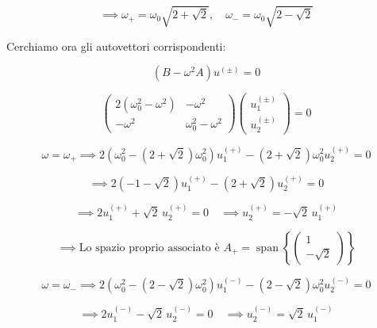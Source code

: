\begin{equation}
\implies \omega_+ = \omega_0 \sqrt{2 + \sqrt{2}}, \quad 
\omega_- = \omega_0 \sqrt{2 - \sqrt{2}}
\end{equation}

Cerchiamo ora gli autovettori corrispondenti:

\begin{equation*}
(B - \omega^2 A)u^{(\pm)} = 0
\end{equation*}

\begin{equation*}
\begin{pmatrix}
2(\omega_0^2 - \omega^2) & -\omega^2 \\
-\omega^2 & \omega_0^2 - \omega^2
\end{pmatrix}
\begin{pmatrix}
u^{(\pm)}_1 \\ u^{(\pm)}_2
\end{pmatrix}
= 0
\end{equation*}


\begin{equation*}
\omega = \omega_+ \implies 2(\omega_0^2 - (2+\sqrt{2})\omega_0^2)u^{(+)}_1 - (2+\sqrt{2})\omega_0^2 u^{(+)}_2 = 0
\end{equation*}

\begin{equation*}
\implies 2(-1-\sqrt{2})u^{(+)}_1 - (2+\sqrt{2})u^{(+)}_2 = 0
\end{equation*}

\begin{equation*}
\implies 2u^{(+)}_1 + \sqrt{2}\,u^{(+)}_2 = 0
\quad \implies u^{(+)}_2 = -\sqrt{2}\,u^{(+)}_1
\end{equation*}

\begin{equation}
\implies \text{Lo spazio proprio associato è } 
A_+ = \operatorname{span}\left\{ \begin{pmatrix} 1 \\ -\sqrt{2} \end{pmatrix} \right\}
\end{equation}


\begin{equation*}
\omega = \omega_- \implies 2(\omega_0^2 - (2-\sqrt{2})\omega_0^2)u^{(-)}_1 - (2-\sqrt{2})\omega_0^2 u^{(-)}_2 = 0
\end{equation*}

\begin{equation*}
\implies 2u^{(-)}_1 - \sqrt{2}\,u^{(-)}_2 = 0
\quad \implies u^{(-)}_2 = \sqrt{2}\,u^{(-)}_1
\end{equation*}


